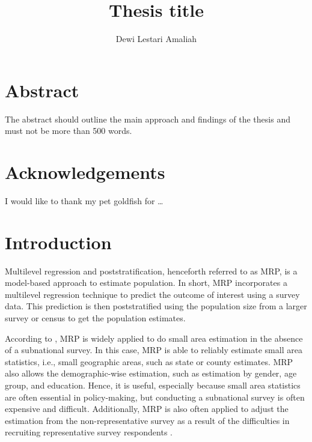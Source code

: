 \documentclass{monashthesis}
\author{Dewi Lestari Amaliah}
\title{Thesis title}
\begin{document}

\titlepage

{\sf\tighttoc\doublespacing}

\clearpage{}\setcounter{page}{0}

\hypertarget{abstract}{%
\chapter*{Abstract}\label{abstract}}

The abstract should outline the main approach and findings of the thesis and must not be more than 500 words.

\newpage

\hypertarget{acknowledgements}{%
\chapter*{Acknowledgements}\label{acknowledgements}}

I would like to thank my pet goldfish for \dots

\hypertarget{ch:intro}{%
\chapter{Introduction}\label{ch:intro}}

Multilevel regression and poststratification, henceforth referred to as MRP, is a model-based approach to estimate population. In short, MRP incorporates a multilevel regression technique to predict the outcome of interest using a survey data. This prediction is then poststratified using the population size from a larger survey or census to get the population estimates.

According to \textcite{mrp-book}, MRP is widely applied to do small area estimation in the absence of a subnational survey. In this case, MRP is able to reliably estimate small area statistics, i.e., small geographic areas, such as state or county estimates. MRP also allows the demographic-wise estimation, such as estimation by gender, age group, and education. Hence, it is useful, especially because small area statistics are often essential in policy-making, but conducting a subnational survey is often expensive and difficult. Additionally, MRP is also often applied to adjust the estimation from the non-representative survey as a result of the difficulties in recruiting representative survey respondents \autocite{mrp-book}.
\end{document}

